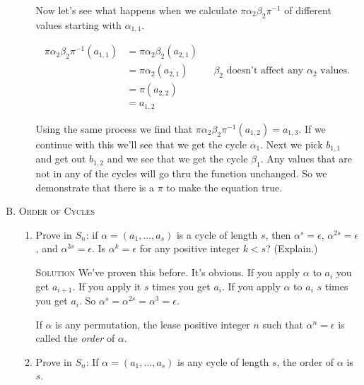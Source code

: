 \documentclass[twoside]{amsart}
\newcommand{\solution}{\textsc{Solution}\xspace}
\begin{document}
\begin{enumerate}[A.]
\begin{enumerate}[1]
       Now let's see what happens when we calculate
       $\pi\alpha_2\beta_2\pi^{-1}$ of different values starting
       with $\alpha_{1,1}$. 

       \begin{align*}
           \pi\alpha_2\beta_2\pi^{-1}(a_{1,1}) &= 
                   \pi\alpha_2\beta_2(a_{2,1}) \\
               &=  \pi\alpha_2(a_{2,1}) && \text{$\beta_2$ doesn't affect any
                        $\alpha_2$ values.}\\
               &=  \pi(a_{2,2})          \\
               &=  a_{1,2}
       \end{align*}

       Using the same process we find that $\pi\alpha_2\beta_2
       \pi^{-1}(a_{1,2}) = a_{1,3}$. If we continue with this
       we'll see that we get the cycle $\alpha_1$. Next we pick
       $b_{1,1}$ and get out $b_{1,2}$ and we see that we get the
       cycle $\beta_1$. Any values that are not in any of the cycles
       will go thru the function unchanged. So we demonstrate
       that there is a $\pi$ to make the equation true.

   \end{enumerate}


   \item \textsc{Order of Cycles}

   \begin{enumerate}[1]

      \item Prove in $S_n$: if $\alpha = (a_1, \ldots, a_s)$ is a cycle
      of length $s$, then $\alpha^s = \epsilon$, $\alpha^{2s}=\epsilon$,
      and $\alpha^{3s}=\epsilon$. Is $\alpha^k = \epsilon$ for any positive
      integer $k < s$? (Explain.)

      \noindent \solution We've proven this before. It's obvious. If
      you apply $\alpha$ to $a_i$ you get $a_{i+1}$. If you apply it
      $s$ times you get $a_i$. If you apply $\alpha$ to $a_i$ $s$ times you
      get $a_i$. So $\alpha^s=\alpha^{2s}=\alpha^{3}=\epsilon$.

\vspace{10pt}
      If $\alpha$ is any permutation, the lease positive integer $n$
      such that $\alpha^n=\epsilon$ is called the \emph{order} of
      $\alpha$.
\vspace{10pt}

      \item  Prove in $S_n$: If $\alpha=(a_1,\ldots,a_s)$ is any cycle 
      of length $s$, the order of $\alpha$ is $s$.


\end{enumerate}
\end{enumerate}
\end{document}
